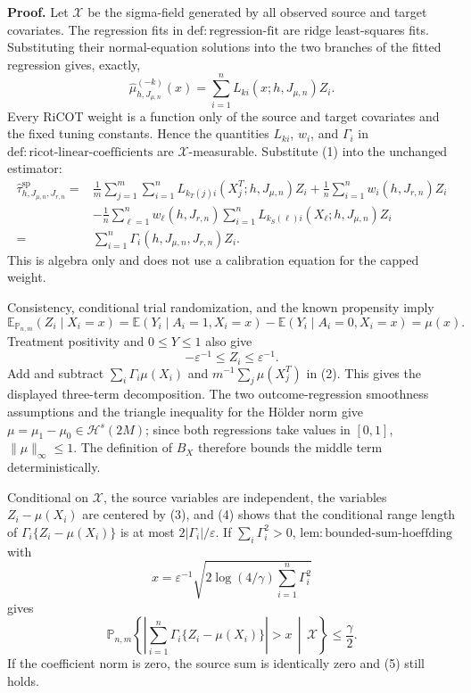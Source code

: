 \textbf{Proof.}
Let \(\mathscr X\) be the sigma-field generated by all observed source and target covariates. The regression fits in \(\mathrm{def:regression\text{-}fit}\) are ridge least-squares fits. Substituting their normal-equation solutions into the two branches of the fitted regression gives, exactly,
\[
\widehat\mu^{(-k)}_{h,J_{\mu,n}}(x)
=\sum_{i=1}^nL_{ki}(x;h,J_{\mu,n})Z_i.
\tag{1}
\]
Every RiCOT weight is a function only of the source and target covariates and the fixed tuning constants. Hence the quantities \(L_{ki}\), \(w_i\), and \(\Gamma_i\) in \(\mathrm{def:ricot\text{-}linear\text{-}coefficients}\) are \(\mathscr X\)-measurable. Substitute (1) into the unchanged estimator:
\[
\begin{aligned}
\widehat\tau^{\mathrm{sp}}_{h,J_{\mu,n},J_{r,n}}
={}&\frac1m\sum_{j=1}^m\sum_{i=1}^nL_{k_T(j)i}(X_j^T;h,J_{\mu,n})Z_i
+\frac1n\sum_{i=1}^nw_i(h,J_{r,n})Z_i\\
&-\frac1n\sum_{\ell=1}^nw_\ell(h,J_{r,n})
\sum_{i=1}^nL_{k_S(\ell)i}(X_\ell;h,J_{\mu,n})Z_i\\
=&\sum_{i=1}^n\Gamma_i(h,J_{\mu,n},J_{r,n})Z_i.
\end{aligned}
\tag{2}
\]
This is algebra only and does not use a calibration equation for the capped weight.

Consistency, conditional trial randomization, and the known propensity imply
\[
\mathbb E_{\mathbb P_{n,m}}(Z_i\mid X_i=x)
=\mathbb E(Y_i\mid A_i=1,X_i=x)-\mathbb E(Y_i\mid A_i=0,X_i=x)
=\mu(x).
\tag{3}
\]
Treatment positivity and \(0\le Y\le1\) also give
\[
-\varepsilon^{-1}\le Z_i\le\varepsilon^{-1}.
\tag{4}
\]
Add and subtract \(\sum_i\Gamma_i\mu(X_i)\) and \(m^{-1}\sum_j\mu(X_j^T)\) in (2). This gives the displayed three-term decomposition. The two outcome-regression smoothness assumptions and the triangle inequality for the Hölder norm give \(\mu=\mu_1-\mu_0\in\mathcal H^s(2M)\); since both regressions take values in \([0,1]\), \(\|\mu\|_\infty\le1\). The definition of \(B_X\) therefore bounds the middle term deterministically.

Conditional on \(\mathscr X\), the source variables are independent, the variables \(Z_i-\mu(X_i)\) are centered by (3), and (4) shows that the conditional range length of \(\Gamma_i\{Z_i-\mu(X_i)\}\) is at most \(2|\Gamma_i|/\varepsilon\). If \(\sum_i\Gamma_i^2>0\), \(\mathrm{lem:bounded\text{-}sum\text{-}hoeffding}\) with
\[
x=\varepsilon^{-1}\sqrt{2\log(4/\gamma)\sum_{i=1}^n\Gamma_i^2}
\]
gives
\[
\mathbb P_{n,m}\!\left\{
\left|\sum_{i=1}^n\Gamma_i\{Z_i-\mu(X_i)\}\right|>x
\,\middle|\,\mathscr X\right\}\le\frac\gamma2.
\tag{5}
\]
If the coefficient norm is zero, the source sum is identically zero and (5) still holds.

